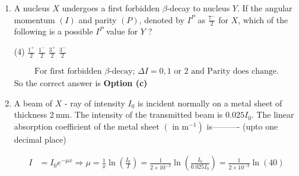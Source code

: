 \begin{enumerate}
\begin{tasks}
		\task[\textbf{a.}]Allowed both by Fermi and Gamow-Teller selection rule
		\task[\textbf{b.}] Allowed by Fermi and but not by Gamow-Teller selection rule
		\task[\textbf{c.}]Not allowed by Fermi but allowed by Gamow-Teller selection rule
		\task[\textbf{d.}] Not allowed both by Fermi and Gamow-Teller selection rule
	\end{tasks}
	\begin{answer}
		\begin{align*}
		&\text{ According to Fermi Selection Rule:}\\
		&\text{$\Delta I=0,$ \quad \text { Parity }=\text { No Change }}\\
		&\text{	According to Gammow-Teller Selection Rule: $\Delta I=0, \pm 1, \quad$ Parity $=$ No Change}\\
		&\text{In the $\beta$ decay process, the transition $2^{+} \rightarrow 3^{+}$, $\Delta I=\pm 1, \quad$ Parity $=$ No Change.}
		\end{align*}
		So the correct answer is \textbf{Option (c)}
	\end{answer}
	\item  A nucleus $X$ undergoes a first forbidden $\beta$-decay to nucleus $Y$. If the angular momentum $(I)$ and parity $(P)$, denoted by $I^P$ as $\frac{7^{-}}{2}$ for $X$, which of the following is a possible $I^P$ value for $Y$ ?
	{}
	\begin{tasks}(4)
		\task[\textbf{a.}]$\frac{1^{+}}{2}$
		\task[\textbf{b.}]$\frac{1^{-}}{2}$
		\task[\textbf{c.}]$\frac{3^{+}}{2}$
		\task[\textbf{d.}]$\frac{3^{-}}{2}$ 
	\end{tasks}
	\begin{answer}
		\begin{align*}
		\text { For first forbidden } \beta \text {-decay; } \Delta I=0,1 \text { or } 2 \text { and Parity does change. }
		\end{align*}
		So the correct answer is \textbf{Option (c)}
	\end{answer}
	\item A beam of $X$ - ray of intensity $I_0$ is incident normally on a metal sheet of thickness $2 \mathrm{~mm}$. The intensity of the transmitted beam is $0.025 I_0$. The linear absorption coefficient of the metal sheet $\left(\right.$ in $\left.\mathrm{m}^{-1}\right)$ is---------- (upto one decimal place)
	{}
	\begin{answer}
		\begin{align*}
		I&=I_0 e^{-\mu x} \Rightarrow \mu=\frac{1}{x} \ln \left(\frac{I_0}{I}\right)=\frac{1}{2 \times 10^{-3}} \ln \left(\frac{I_0}{0.025 I_0}\right)=\frac{1}{2 \times 10^{-3}} \ln (40)\\

\end{align*}
\end{answer}
\end{enumerate}
